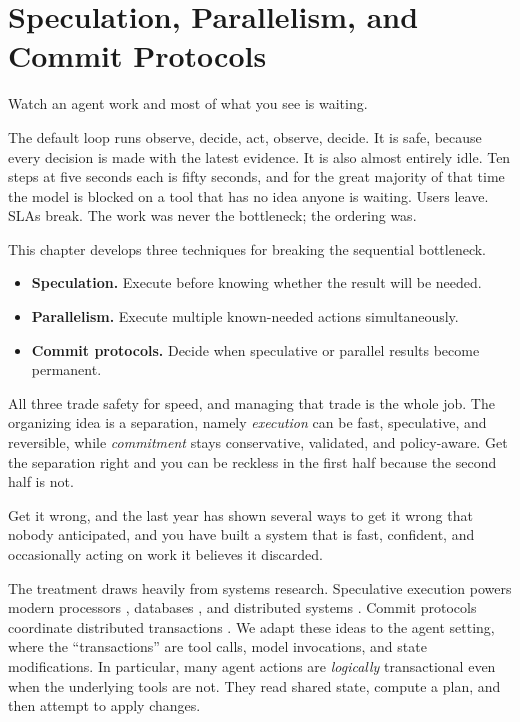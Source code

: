 \chapter{Speculation, Parallelism, and Commit Protocols}
\label{ch:speculation}

Watch an agent work and most of what you see is waiting.

The default loop runs observe, decide, act, observe, decide. It is safe, because every decision is made with the latest evidence. It is also almost entirely idle. Ten steps at five seconds each is fifty seconds, and for the great majority of that time the model is blocked on a tool that has no idea anyone is waiting. Users leave. SLAs break. The work was never the bottleneck; the ordering was.

This chapter develops three techniques for breaking the sequential bottleneck.

\begin{itemize}
\item \textbf{Speculation.} Execute before knowing whether the result will be needed.
\item \textbf{Parallelism.} Execute multiple known-needed actions simultaneously.
\item \textbf{Commit protocols.} Decide when speculative or parallel results become permanent.
\end{itemize}

All three trade safety for speed, and managing that trade is the whole job. The organizing idea is a separation, namely \emph{execution} can be fast, speculative, and reversible, while \emph{commitment} stays conservative, validated, and policy-aware. Get the separation right and you can be reckless in the first half because the second half is not.

Get it wrong, and the last year has shown several ways to get it wrong that nobody anticipated, and you have built a system that is fast, confident, and occasionally acting on work it believes it discarded.

The treatment draws heavily from systems research. Speculative execution powers modern processors \cite{hennessy2017computer}, databases \cite{gray1992transaction}, and distributed systems \cite{nightingale2006speculative}. Commit protocols coordinate distributed transactions \cite{garciamolina1987sagas, mohan1986transaction}. We adapt these ideas to the agent setting, where the ``transactions'' are tool calls, model invocations, and state modifications. In particular, many agent actions are \emph{logically} transactional even when the underlying tools are not. They read shared state, compute a plan, and then attempt to apply changes.

